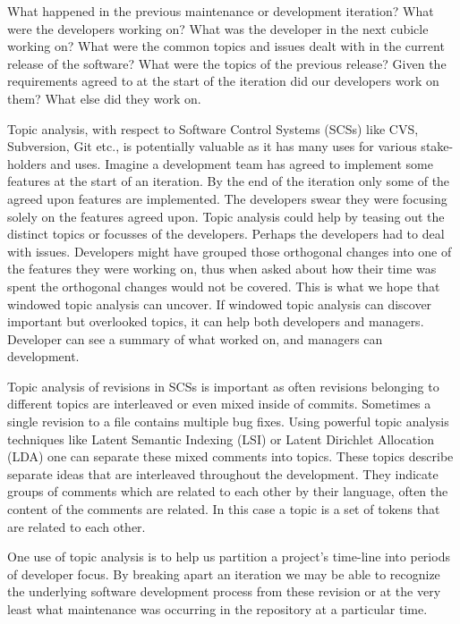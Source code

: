 \documentclass[times, 10pt,twocolumn]{article}
\begin{document}


What happened in the previous maintenance or development iteration? What were the developers
working on? What was the developer in the next cubicle working on?
What were the common topics and issues dealt with in the current
release of the software? What were the topics of the previous release?
Given the requirements agreed to at the start of the iteration did our
developers work on them? What else did they work on. 

Topic analysis, with respect to Software Control Systems (SCSs) like
CVS, Subversion, Git etc., is potentially valuable as it has many uses
for various stake-holders and uses.
Imagine a
development team has agreed to implement some features at the start of
an iteration. By the end of the iteration only some of the agreed upon
features are implemented. The developers swear they were focusing
solely on the features agreed upon. Topic analysis could help by
teasing out the distinct topics or focusses of the developers. Perhaps
the developers had to deal with issues.
Developers might have grouped those orthogonal changes into
one of the features they were working on, thus when asked about how
their time was spent the orthogonal changes would not be covered. This
is what we hope that windowed topic analysis can uncover. If windowed
topic analysis can discover important but overlooked topics, it can
help both developers and managers. Developer can see a
summary of what worked on, and managers can development.


Topic analysis of revisions in SCSs is important as often revisions
belonging to different topics are interleaved or even mixed inside of
commits.  Sometimes a single revision to a file contains multiple bug
fixes.  Using powerful topic analysis techniques like Latent Semantic
Indexing (LSI) or Latent Dirichlet Allocation (LDA) one can separate
these mixed comments into topics. These topics describe separate ideas
that are interleaved throughout the development. They indicate groups
of comments which are related to each other by their language, often
the content of the comments are related.  In this case a topic is a
set of tokens that are related to each other.


One use of topic analysis is to help us partition a project's
time-line into periods  of developer focus. By breaking apart an
iteration we may be able to recognize the underlying software
development process from these revision or at the very least what
maintenance was occurring in the repository at a particular time.
\end{document}
